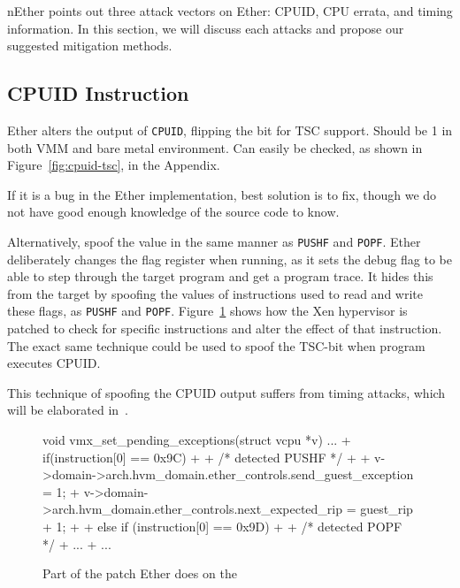 nEther\cite{nether} points out three attack vectors on Ether\cite{ether}: CPUID, CPU errata, and timing information. In this section, we will discuss each attacks and propose our suggested mitigation methods.


\subsection{CPUID Instruction}
\label{sec:approach-cpuid}

Ether alters the output of {\tt CPUID}, flipping the bit for TSC support. Should
be 1 in both VMM and bare metal environment. Can easily be checked, as shown in
Figure~\ref{fig:cpuid-tsc}, in the Appendix.

If it is a bug in the Ether implementation, best solution is to fix, though we
do not have good enough knowledge of the source code to know.

Alternatively, spoof the value in the same manner as {\tt PUSHF} and {\tt POPF}.
Ether deliberately changes the flag register when running, as it sets the debug
flag to be able to step through the target program and get a program trace. It
hides this from the target by spoofing the values of instructions used to read
and write these flags, as {\tt PUSHF} and {\tt POPF}. Figure~\ref{fig:pushf}
shows how the Xen hypervisor is patched to check for specific instructions and
alter the effect of that instruction. The exact same technique could be used to
spoof the TSC-bit when program executes CPUID.

This technique of spoofing the CPUID output suffers from timing attacks, which
will be elaborated in~.

\begin{figure}
\begin{lstc}
void vmx_set_pending_exceptions(struct vcpu *v)
{
    ...
+    if(instruction[0] == 0x9C)
+    {
+         /* detected PUSHF */
+
+         v->domain->arch.hvm_domain.ether_controls.send_guest_exception = 1;
+         v->domain->arch.hvm_domain.ether_controls.next_expected_rip = guest_rip + 1;
+    }
+    else if (instruction[0] == 0x9D)
+    {
+         /* detected POPF */
+         ...
+    }
    ...
}
\end{lstc}
\caption{\label{fig:pushf} Part of the patch Ether does on the }
\end{figure}


